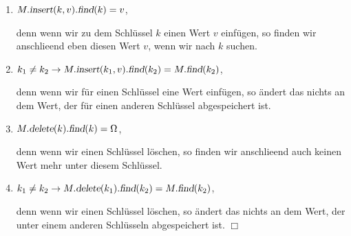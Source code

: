 \begin{Definition}[Abbildung]
{\begin{enumerate}
\begin{enumerate}
              denn der Aufruf $\textsl{Map}()$ erzeugt eine leere Abbildung.
        \item $M.\textsl{insert}(k, v).\textsl{find}(k) = v$,

              denn wenn wir zu dem Schl\"ussel $k$ einen Wert $v$ einf\"ugen, so finden 
              wir anschlie\3end eben diesen Wert $v$, wenn wir nach $k$ suchen.
        \item $k_1 \not= k_2 \rightarrow M.\textsl{insert}(k_1, v).\textsl{find}(k_2) = M.\textsl{find}(k_2)$,

              denn wenn wir f\"ur einen Schl\"ussel eine Wert einf\"ugen, so \"andert das
              nichts an dem Wert, der f\"ur einen anderen Schl\"ussel abgespeichert ist.
        \item $M.\textsl{delete}(k).\textsl{find}(k) = \Omega$,

              denn wenn wir einen Schl\"ussel l\"oschen, so finden wir anschlie\3end auch
              keinen Wert mehr unter diesem Schl\"ussel.
        \item $k_1 \not= k_2 \rightarrow M.\textsl{delete}(k_1).\textsl{find}(k_2) = M.\textsl{find}(k_2)$,

              denn wenn wir einen Schl\"ussel  l\"oschen, so \"andert das nichts an dem
              Wert, der unter einem anderen Schl\"usseln abgespeichert ist. \hspace*{\fill} $\Box$
        \end{enumerate}
  \end{enumerate}
}
\end{Definition}


